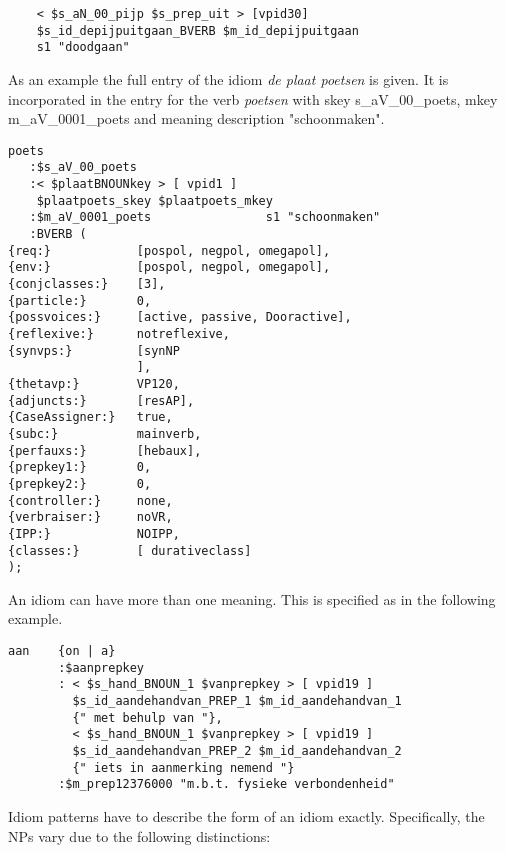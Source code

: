 \begin{verbatim}
    < $s_aN_00_pijp $s_prep_uit > [vpid30]
    $s_id_depijpuitgaan_BVERB $m_id_depijpuitgaan
    s1 "doodgaan" 
\end{verbatim}



As an example the full entry of the idiom {\em de plaat poetsen} is given. It 
is incorporated in the entry for the verb {\em poetsen} with skey
s\_aV\_00\_poets, mkey m\_aV\_0001\_poets and meaning description
"schoonmaken". 

\begin{verbatim}
poets
   :$s_aV_00_poets
   :< $plaatBNOUNkey > [ vpid1 ] 
    $plaatpoets_skey $plaatpoets_mkey
   :$m_aV_0001_poets                s1 "schoonmaken"
   :BVERB (
{req:}            [pospol, negpol, omegapol],
{env:}            [pospol, negpol, omegapol],
{conjclasses:}    [3],
{particle:}       0,
{possvoices:}     [active, passive, Dooractive],
{reflexive:}      notreflexive,
{synvps:}         [synNP
                  ],
{thetavp:}        VP120,
{adjuncts:}       [resAP],
{CaseAssigner:}   true,
{subc:}           mainverb,
{perfauxs:}       [hebaux],
{prepkey1:}       0,
{prepkey2:}       0,
{controller:}     none,
{verbraiser:}     noVR,
{IPP:}            NOIPP,
{classes:}        [ durativeclass]
);
\end{verbatim}

An idiom can have more than one meaning. This is specified as in the following 
example.

\begin{verbatim}
aan    {on | a} 
       :$aanprepkey
       : < $s_hand_BNOUN_1 $vanprepkey > [ vpid19 ]
         $s_id_aandehandvan_PREP_1 $m_id_aandehandvan_1
         {" met behulp van "},
         < $s_hand_BNOUN_1 $vanprepkey > [ vpid19 ]
         $s_id_aandehandvan_PREP_2 $m_id_aandehandvan_2
         {" iets in aanmerking nemend "}
       :$m_prep12376000 "m.b.t. fysieke verbondenheid"
\end{verbatim}

Idiom patterns have to describe the form of an idiom exactly. Specifically, the
NPs vary due to the following distinctions: 

